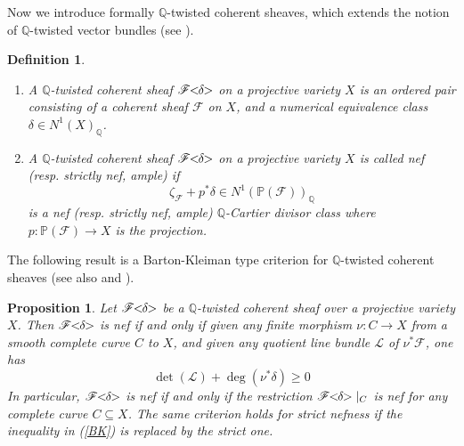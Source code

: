 \documentclass[english,reqno]{amsart}
\newcommand\bbP{{\mathbb P}}
\newcommand\bbQ{{\mathbb Q}}
\newcommand\sF{{\mathscr F}}
\newcommand\sL{{\mathscr L}}
\theoremstyle{plain}
\newtheorem{prop}[thm]{Proposition}
\newtheorem{defn}[thm]{Definition}
\theoremstyle{definition}
\numberwithin{equation}{section} %
\begin{document}
Now we introduce formally  $\bbQ$-twisted coherent sheaves, which extends the notion of $\bbQ$-twisted vector bundles (see \cite[\S\,6.2]{Lazarsfeld2004a}).




\begin{defn}%
    \begin{enumerate}
        \item A $\bbQ$-twisted coherent sheaf $\sF\hspace{-0.8ex}<\hspace{-0.8ex}\delta\hspace{-0.8ex}>$ on a projective variety $X$ is an ordered pair consisting of a coherent sheaf $\sF$ on $X$,
        and a numerical equivalence class $\delta\in N^1(X)_{\bbQ}$.

        \item A $\bbQ$-twisted coherent sheaf $\sF\hspace{-0.8ex}<\hspace{-0.8ex}\delta\hspace{-0.8ex}>$ on a projective variety $X$ is called nef (resp. strictly nef, ample) if
        \[\zeta_{\sF}+p^*\delta\in N^1(\bbP(\sF))_{\bbQ}\]
        is a nef (resp. strictly nef, ample) $\bbQ$-Cartier divisor class where $p\colon \mathbb{P}(\sF) \to  X$ is the projection.
    \end{enumerate}
\end{defn}

The following result is  a Barton-Kleiman type criterion for
$\bbQ$-twisted coherent sheaves (see also \cite[Proposition
6.1.18]{Lazarsfeld2004a} and \cite[Proposition 2.1]{LiOuYang2019}).

\begin{prop}\label{BK criterion}
    Let $\sF\hspace{-0.8ex}<\hspace{-0.8ex}\delta\hspace{-0.8ex}>$ be a $\bbQ$-twisted coherent sheaf over a projective variety $X$. Then $\sF\hspace{-0.8ex}<\hspace{-0.8ex}\delta\hspace{-0.8ex}>$ is nef   if and only if given any finite morphism $\nu\colon C\rightarrow X$ from a smooth complete curve $C$ to $X$, and given any quotient line bundle $\sL$ of $\nu^*\sF$, one has
    \begin{equation}
        \det(\sL)+\deg(\nu^*\delta)\geqslant 0\label{BK}
    \end{equation}
    In particular, $\sF\hspace{-0.8ex}<\hspace{-0.8ex}\delta\hspace{-0.8ex}>$ is nef   if and only if the restriction $\sF\hspace{-0.8ex}<\hspace{-0.8ex}\delta\hspace{-0.8ex}>\vert_C$ is nef  for any complete curve $C\subseteq X$. The same criterion holds for strict nefness if  the  inequality in (\ref{BK}) is replaced by the strict  one.
\end{prop}
\end{document}
